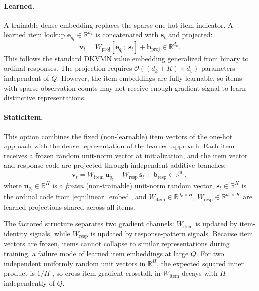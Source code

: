 \documentclass[pdflatex,sn-apa]{sn-jnl}
\begin{document}
\paragraph{Learned.} A trainable dense embedding replaces the sparse one-hot item indicator. A learned item lookup $\mathbf{e}_{q_t} \in \mathbb{R}^{d_k}$ is concatenated with $\mathbf{s}_t$ and projected:
\begin{equation}\label{eqn:lie}
    \mathbf{v}_t = W_{\mathrm{proj}}[\mathbf{e}_{q_t};\;\mathbf{s}_t] + \mathbf{b}_{\mathrm{proj}} \in \mathbb{R}^{d_v}.
\end{equation}
This follows the standard DKVMN value embedding \citep{zhang_dynamic_2017} generalized from binary to ordinal responses. The projection requires $\mathcal{O}((d_k + K) \times d_v)$ parameters independent of $Q$. However, the item embeddings are fully learnable, so items with sparse observation counts may not receive enough gradient signal to learn distinctive representations.

\paragraph{StaticItem.} This option combines the fixed (non-learnable) item vectors of the one-hot approach with the dense representation of the learned approach. Each item receives a frozen random unit-norm vector at initialization, and the item vector and response code are projected through independent additive branches:
\begin{equation}\label{eqn:sie}
    \mathbf{v}_t = W_{\mathrm{item}}\,\mathbf{u}_{q_t} + W_{\mathrm{resp}}\,\mathbf{s}_t + \mathbf{b}_{\mathrm{resp}} \in \mathbb{R}^{d_v},
\end{equation}
where $\mathbf{u}_{q_t} \in \mathbb{R}^{H}$ is a \emph{frozen} (non-trainable) unit-norm random vector, $\mathbf{s}_t \in \mathbb{R}^K$ is the ordinal code from \eqref{eqn:linear_embed}, and $W_{\mathrm{item}} \in \mathbb{R}^{d_v \times H}$, $W_{\mathrm{resp}} \in \mathbb{R}^{d_v \times K}$ are learned projections shared across all items.

The factored structure separates two gradient channels: $W_{\mathrm{item}}$ is updated by item-identity signals, while $W_{\mathrm{resp}}$ is updated by response-pattern signals. Because item vectors are frozen, items cannot collapse to similar representations during training, a failure mode of learned item embeddings at large $Q$. For two independent uniformly random unit vectors in $\mathbb{R}^H$, the expected squared inner product is $1/H$ \citep{dasgupta_elementary_2003}, so cross-item gradient crosstalk in $W_{\mathrm{item}}$ decays with $H$ independently of $Q$.
\end{document}
